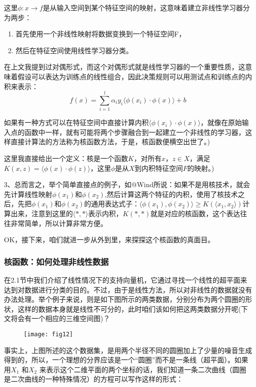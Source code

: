 \documentclass[a4paper,12pt]{article}
\begin{document}
这里$\phi:x\rightarrow f$是从输入空间到某个特征空间的映射，这意味着建立非线性学习器分为两步：
\begin{enumerate}[1.~]
    \item 首先使用一个非线性映射将数据变换到一个特征空间F，
    \item 然后在特征空间使用线性学习器分类。
\end{enumerate}

在上文我提到过对偶形式，而这个对偶形式就是线性学习器的一个重要性质，这意味着假设可以表达为训练点的线性组合，因此决策规则可以用测试点和训练点的内积来表示：
\begin{equation}
  f(x)=\sum_{i=1}^l\alpha_iy_i\langle\phi(x_i)\cdot\phi(x)\rangle+b
\end{equation}

如果有一种方式可以在特征空间中直接计算内积$\langle\phi(x_i)\cdot\phi(x)\rangle$，就像在原始输入点的函数中一样，就有可能将两个步骤融合到一起建立一个非线性的学习器，这样直接计算法的方法称为核函数方法，于是，核函数便横空出世了。)

这里我直接给出一个定义：核是一个函数$K$，对所有$x$，$z\in X$，满足$K(x,z)=\langle\phi(x)\cdot\phi(z)\rangle$，这里$\phi$是从$X$到内积特征空间$F$的映射。)

3、总而言之，举个简单直接点的例子，如@Wind所说：如果不是用核技术，就会先计算线性映射$\phi(x_1)$和$\phi(x_2)$,然后计算这两个特征的内积，使用了核技术之后，先把$\phi(x_1)$和$\phi(x_2)$的通用表达式子：$\langle\phi(x_1),\phi(x_2)\rangle\geq K(\langle x_1,x_2\rangle)$计算出来，注意到这里的$\langle*,*\rangle$表示内积，$K(*,*)$就是对应的核函数，这个表达往往非常简单，所以计算非常方便。
 
 OK，接下来，咱们就进一步从外到里，来探探这个核函数的真面目。
 \subsubsection{核函数：如何处理非线性数据}
 在2.1节中我们介绍了线性情况下的支持向量机，它通过寻找一个线性的超平面来达到对数据进行分类的目的。不过，由于是线性方法，所以对非线性的数据就没有办法处理。举个例子来说，则是如下图所示的两类数据，分别分布为两个圆圈的形状，这样的数据本身就是线性不可分的，此时咱们该如何把这两类数据分开呢(下文将会有一个相应的三维空间图)？

 \begin{figure}[H]
   \centering
   \texttt{[image: fig12]}
 \end{figure}

 事实上，上图所述的这个数据集，是用两个半径不同的圆圈加上了少量的噪音生成得到的，所以，一个理想的分界应该是一个“圆圈”而不是一条线（超平面）。如果用$X_1$ 和$X_2$ 来表示这个二维平面的两个坐标的话，我们知道一条二次曲线（圆圈是二次曲线的一种特殊情况）的方程可以写作这样的形式：
\end{document}
